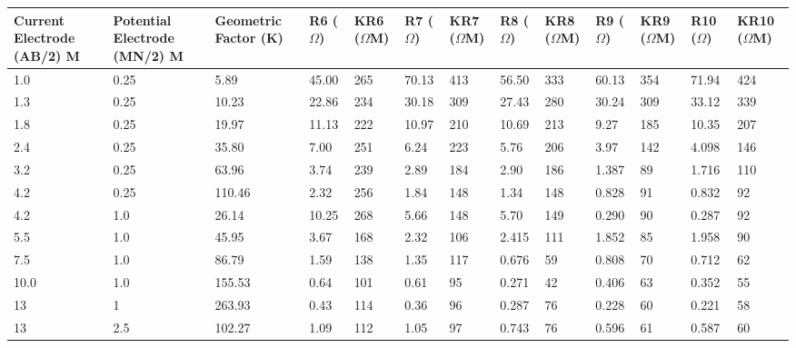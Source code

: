 \documentclass[12pt,a4paper]{report}
\begin{document}
\begin{itemize}
    \begin{table}[H]
        \centering
        \begin{adjustbox}{max width=\textwidth}
        \renewcommand{\arraystretch}{1.5}
        \begin{tabular}{|p{2.5cm}|p{2.5cm}|p{2.5cm}|p{1.5cm}|p{1.8cm}|p{1.5cm}|p{1.8cm}|p{1.5cm}|p{1.8cm}|p{1.5cm}|p{1.8cm}|p{1.5cm}|p{1.8cm}|}
        \hline
        \textbf{Current Electrode (AB/2) M} & 
        \textbf{Potential Electrode (MN/2) M} & 
        \textbf{Geometric Factor (K)} & 
        \textbf{R6 ($\Omega$)} & 
        \textbf{KR6 ($\Omega$M)} & 
        \textbf{R7 ($\Omega$)} & 
        \textbf{KR7 ($\Omega$M)} & 
        \textbf{R8 ($\Omega$)} & 
        \textbf{KR8 ($\Omega$M)} & 
        \textbf{R9 ($\Omega$)} & 
        \textbf{KR9 ($\Omega$M)} & 
        \textbf{R10 ($\Omega$)} & 
        \textbf{KR10 ($\Omega$M)} \\ 
        \hline
        1.0 & 0.25 & 5.89 & 45.00 & 265 & 70.13 & 413 & 56.50 & 333 & 60.13 & 354 & 71.94 & 424 \\ \hline
        1.3 & 0.25 & 10.23 & 22.86 & 234 & 30.18 & 309 & 27.43 & 280 & 30.24 & 309 & 33.12 & 339 \\ \hline
        1.8 & 0.25 & 19.97 & 11.13 & 222 & 10.97 & 210 & 10.69 & 213 & 9.27 & 185 & 10.35 & 207 \\ \hline
        2.4 & 0.25 & 35.80 & 7.00 & 251 & 6.24 & 223 & 5.76 & 206 & 3.97 & 142 & 4.098 & 146 \\ \hline
        3.2 & 0.25 & 63.96 & 3.74 & 239 & 2.89 & 184 & 2.90 & 186 & 1.387 & 89 & 1.716 & 110 \\ \hline
        4.2 & 0.25 & 110.46 & 2.32 & 256 & 1.84 & 148 & 1.34 & 148 & 0.828 & 91 & 0.832 & 92 \\ \hline
        4.2 & 1.0 & 26.14 & 10.25 & 268 & 5.66 & 148 & 5.70 & 149 & 0.290 & 90 & 0.287 & 92 \\ \hline
        5.5 & 1.0 & 45.95 & 3.67 & 168 & 2.32 & 106 & 2.415 & 111 & 1.852 & 85 & 1.958 & 90 \\ \hline
        7.5 & 1.0 & 86.79 & 1.59 & 138 & 1.35 & 117 & 0.676 & 59 & 0.808 & 70 & 0.712 & 62 \\ \hline
        10.0 & 1.0 & 155.53 & 0.64 & 101 & 0.61 & 95 & 0.271 & 42 & 0.406 & 63 & 0.352 & 55 \\ \hline
        13 & 1 & 263.93 & 0.43 & 114 & 0.36 & 96 & 0.287 & 76 & 0.228 & 60 & 0.221 & 58 \\ \hline
        13 & 2.5 & 102.27 & 1.09 & 112 & 1.05 & 97 & 0.743 & 76 & 0.596 & 61 & 0.587 & 60 \\ \hline

\end{tabular}
\end{adjustbox}
\end{table}
\end{itemize}
\end{document}
